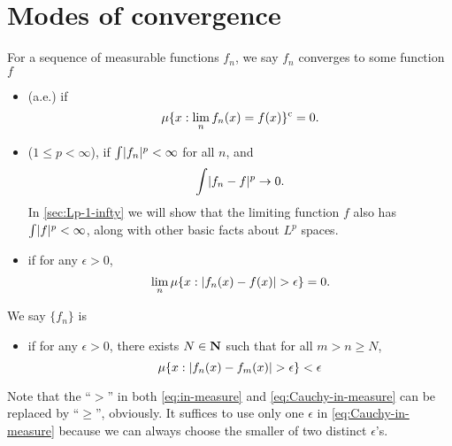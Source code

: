 \section{Modes of convergence} \label{sec:modes-conv}
\begin{defn}
    For a sequence of measurable functions ${f_n}$, we say $f_n$ converges to some function $f$ 
    \begin{itemize}
        \item {} (a.e.) if \[
            \mu\{x: \lim_n f_n(x) = f(x)\}^{\mathrm{c}} = 0.
        \]
        \item {} ($1 \leq p <\infty$), if $\int \lvert f_n \rvert^p <\infty$ for all $n$, and \[
            \int \lvert f_n - f \rvert^p \to 0.
        \]
        In \cref{sec:Lp-1-infty} we will show that the limiting function $f$ also has $\int \lvert f \rvert^p < \infty$, along with other basic facts about $L^p$ spaces.
        \item {} if for any $\epsilon > 0$, \begin{equation} \label{eq:in-measure}
            \lim_n \mu\{x : \lvert f_n(x) - f(x) \rvert > \epsilon\} = 0.
        \end{equation}
    \end{itemize}
    We say $\{f_n\}$ is 
    \begin{itemize}
        \item {} if for any $\epsilon > 0$, there exists $N \in \mathbf{N}$ such that for all $m > n \geq N$, \begin{equation} \label{eq:Cauchy-in-measure}
            \mu\{x:\lvert f_n(x) - f_m(x) \rvert > \epsilon \} < \epsilon
        \end{equation}
    \end{itemize}
    Note that the ``$>$'' in both \eqref{eq:in-measure} and \eqref{eq:Cauchy-in-measure} can be replaced by ``$\geq$'', obviously. It suffices to use only one $\epsilon$ in \eqref{eq:Cauchy-in-measure} because we can always choose the smaller of two distinct $\epsilon$'s.
\end{defn}



